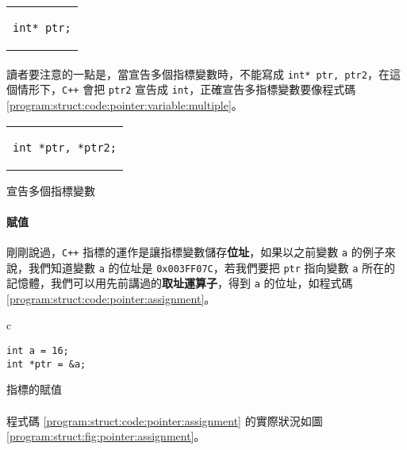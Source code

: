 \documentclass[12pt,a4paper,oneside]{article}
\begin{document}
\begin{CJK}{UTF8}{bkai}
\begin{code}[h!]
\centering
\begin{tabular}{c}
\begin{lstlisting}
int* ptr;
\end{lstlisting}
\end{tabular}
\caption{宣告指標變數 \lstinline!ptr!}
\label{program:struct:code:pointer:variable:another}
\end{code}

\paragraph{}讀者要注意的一點是，當宣告多個指標變數時，不能寫成 \lstinline!int* ptr, ptr2!，在這個情形下，\texttt{C++} 會把 \lstinline!ptr2! 宣告成 \lstinline!int!，正確宣告多指標變數要像程式碼 \ref{program:struct:code:pointer:variable:multiple}。

\begin{code}[h!]
\centering
\begin{tabular}{c}
\begin{lstlisting}
int *ptr, *ptr2;
\end{lstlisting}
\end{tabular}
\caption{宣告多個指標變數}
\label{program:struct:code:pointer:variable:multiple}
\end{code}

\paragraph{賦值}剛剛說過，\texttt{C++} 指標的運作是讓指標變數儲存\textbf{位址}，如果以之前變數 \lstinline!a! 的例子來說，我們知道變數 \lstinline!a! 的位址是 \texttt{0x003FF07C}，若我們要把 \lstinline!ptr! 指向變數 \lstinline!a! 所在的記憶體，我們可以用先前講過的\textbf{取址運算子}，得到 \lstinline!a! 的位址，如程式碼 \ref{program:struct:code:pointer:assignment}。

\begin{code}[h!]
\centering
\begin{tabular}{c}
\begin{lstlisting}
int a = 16;
int *ptr = &a;
\end{lstlisting}
\end{tabular}
\caption{指標的賦值}
\label{program:struct:code:pointer:assignment}
\end{code}

\paragraph{}程式碼 \ref{program:struct:code:pointer:assignment} 的實際狀況如圖 \ref{program:struct:fig:pointer:assignment}。


\end{CJK}
\end{document}
